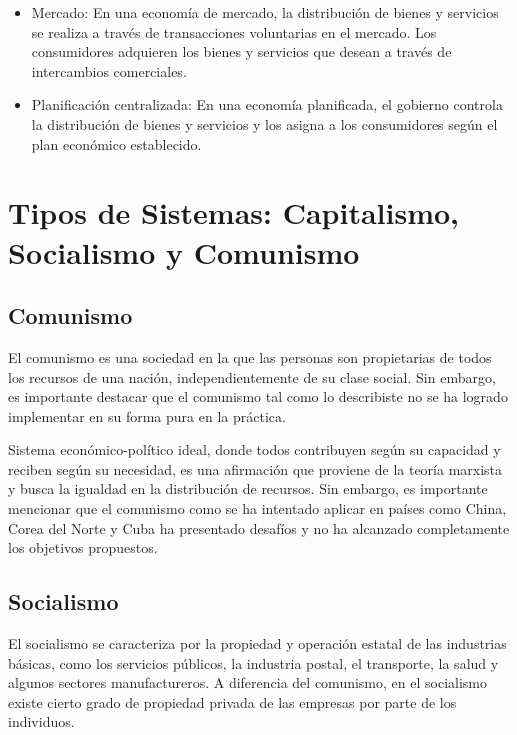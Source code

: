 \documentclass[
  man,
  floatsintext,
  longtable,
  a4paper,
  nolmodern,
  notxfonts,
  notimes,
  12pt,
  colorlinks=true,linkcolor=blue,citecolor=blue,urlcolor=blue]{apa7}
\begin{document}
\begin{itemize}
\item
  Mercado: En una economía de mercado, la distribución de bienes y
  servicios se realiza a través de transacciones voluntarias en el
  mercado. Los consumidores adquieren los bienes y servicios que desean
  a través de intercambios comerciales.
\item
  Planificación centralizada: En una economía planificada, el gobierno
  controla la distribución de bienes y servicios y los asigna a los
  consumidores según el plan económico establecido.
\end{itemize}

\section{Tipos de Sistemas: Capitalismo, Socialismo y
Comunismo}\label{tipos-de-sistemas-capitalismo-socialismo-y-comunismo}

\subsection{Comunismo}\label{comunismo}

El comunismo es una sociedad en la que las personas son propietarias de
todos los recursos de una nación, independientemente de su clase social.
Sin embargo, es importante destacar que el comunismo tal como lo
describiste no se ha logrado implementar en su forma pura en la
práctica.

Sistema económico-político ideal, donde todos contribuyen según su
capacidad y reciben según su necesidad, es una afirmación que proviene
de la teoría marxista y busca la igualdad en la distribución de
recursos. Sin embargo, es importante mencionar que el comunismo como se
ha intentado aplicar en países como China, Corea del Norte y Cuba ha
presentado desafíos y no ha alcanzado completamente los objetivos
propuestos.

\subsection{Socialismo}\label{socialismo}

El socialismo se caracteriza por la propiedad y operación estatal de las
industrias básicas, como los servicios públicos, la industria postal, el
transporte, la salud y algunos sectores manufactureros. A diferencia del
comunismo, en el socialismo existe cierto grado de propiedad privada de
las empresas por parte de los individuos.
\end{document}
